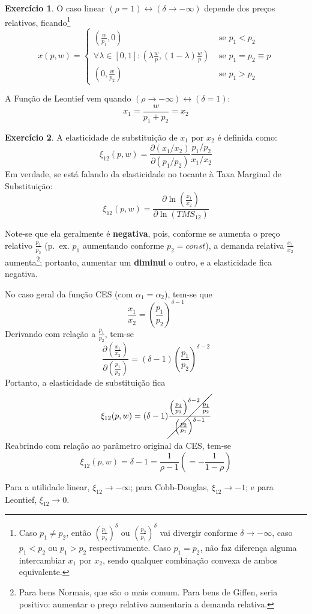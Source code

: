 \documentclass[12pt]{article}
\numberwithin{equation}{section}
\theoremstyle{plain}
\theoremstyle{definition}
\newtheorem{exercise}{Exercício}
\theoremstyle{remark}
\begin{document}
\begin{exercise}
    O caso linear \((\rho=1) \leftrightarrow (\delta \to -\infty)\) depende
dos preços relativos, ficando\footnote{Caso $p_{1} \neq p_{2}$, então $\left( \frac{p_{1}}{p_{2}} \right)^\delta$ ou $\left( \frac{p_{2}}{p_{1}} \right)^\delta$ vai divergir conforme $\delta \to -\infty$, caso $p_{1}<p_{2}$ ou $p_{1} > p_{2}$ respectivamente. Caso $p_{1}=p_{2}$, não faz diferença alguma intercambiar $x_{1}$ por $x_{2}$, sendo qualquer combinação convexa de ambos equivalente.} \[
x(p, w) = 
\begin{cases}
\left( \frac{w}{p_{1}}, 0 \right) \,\, &\text{se } p_{1} < p_{2}  \\
\forall \lambda \in [0,1]: \left( \lambda \frac{w}{p}, (1-\lambda) \frac{w}{p} \right) \,\, &\text{se } p_{1} = p_{2} \equiv p \\
\left( 0, \frac{w}{p_{2}} \right) \,\, &\text{se } p_{1} > p_{2}
\end{cases}
\]

A Função de Leontief vem quando
\((\rho \to -\infty) \leftrightarrow (\delta = 1)\): \[
x_{1} = \frac{w}{p_{1} + p_{2}} = x_{2}
\]
\end{exercise}

\begin{exercise}
    A elasticidade de substituição de \(x_{1}\) por \(x_{2}\) é definida
como: \[
\xi_{12}(p, w) = \frac{ \partial \left(x_{1}/x_{2}\right) }{ \partial \left(p_{1}/p_{2}\right) } \frac{ p_{1}/p_{2}}{x_{1}/x_{2}} 
\] Em verdade, se está falando da elasticidade no tocante à Taxa
Marginal de Substituição: \[
\xi_{12}(p, w) = \frac{ \partial \ln (\frac{x_{1}}{x_{2}}) }{ \partial \ln(TMS_{12}) } 
\]

Note-se que ela geralmente é \textbf{negativa}, pois, conforme se
aumenta o preço relativo \(\frac{p_{1}}{p_{2}}\) (p.~ex. \(p_{1}\)
aumentando conforme \(p_{2}=const\)), a demanda relativa
\(\frac{x_{1}}{x_{2}}\) aumenta\footnote{Para bens Normais, que são o mais comum. Para bens de Giffen, seria positivo: aumentar o preço relativo aumentaria a demanda relativa.}; portanto, aumentar um
\textbf{diminui} o outro, e a elasticidade fica negativa.

No caso geral da função CES (com \(\alpha_{1} = \alpha_{2}\)), tem-se
que \[
\frac{x_{1}}{x_{2}} = \left( \frac{p_{1}}{p_{2}} \right)^{\delta-1}
\] Derivando com relação a \(\frac{p_{1}}{p_{2}}\), tem-se \[
\frac{ \partial \left( \frac{x_{1}}{x_{2}} \right) }{ \partial \left( \frac{p_{1}}{p_{2}} \right) } = (\delta-1) \left( \frac{p_{1}}{p_{2}} \right)^{\delta-2} 
\] Portanto, a elasticidade de substituição fica \[
\xi_{12}(p,w) = (\delta - 1) \cancel{ \frac{\left( \frac{p_{1}}{p_{2}} \right)^{\delta - 2} \frac{p_{1}}{p_{2}}}{\left( \frac{p_{2}}{p_{1}} \right)^{\delta - 1}} }
\] Reabrindo com relação ao parâmetro original da CES, tem-se \[
\xi_{12}(p,w) = \delta - 1 = \frac{1}{\rho - 1} \left( = - \frac{1}{1 - \rho} \right)
\]

Para a utilidade linear, \(\xi_{12} \to - \infty\); para Cobb-Douglas,
\(\xi_{12} \to -1\); e para Leontief, \(\xi_{12} \to 0\).


\end{exercise}
\end{document}
